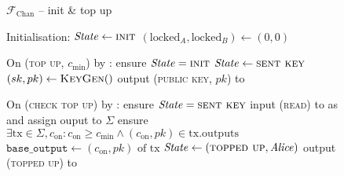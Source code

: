 \begin{figure}[H]
  \begin{systembox}{$\mathcal{F}_{\mathrm{Chan}}$ -- init \& top up}
    \begin{algorithmic}[1]
      \State Initialisation: 
      \Indent
        \State $\mathit{State} \gets \textsc{init}$
        \State $(\mathrm{locked}_A, \mathrm{locked}_B) \gets (0, 0)$
      \EndIndent
      \Statex

      \State On (\textsc{top up}, $c_{\mathrm{min}}$) by \alice:
      \label{code:functionality:chan:skeleton:init:top_up:start}
      \Indent
        \State ensure $\mathit{State} = \textsc{init}$
        \State $\mathit{State} \gets \textsc{sent key}$
        \State $(sk, pk) \gets \textsc{KeyGen}()$
        \State output (\textsc{public key}, $pk$) to \alice
        \label{code:functionality:chan:skeleton:init:top_up:end}
      \EndIndent
      \Statex

      \State On (\textsc{check top up}) by \alice:
      \label{code:functionality:chan:skeleton:init:check_top_up:start}
      \Indent
        \State ensure $\mathit{State} = \textsc{sent key}$
        \State input (\textsc{read}) to \ledger as \alice and assign ouput to
        $\Sigma$
        \State ensure $\exists \mathrm{tx} \in \Sigma, c_{\mathrm{on}}:
        c_{\mathrm{on}} \geq c_{\mathrm{min}} \wedge (c_{\mathrm{on}}, pk) \in
        \mathrm{tx.outputs}$
        \State $\mathtt{base\_output} \gets (c_{\mathrm{on}}, pk) \text{ of tx}$
        \State $\mathit{State} \gets (\textsc{topped up}, \mathit{Alice})$
        \State output (\textsc{topped up}) to \alice
        \label{code:functionality:chan:skeleton:init:check_top_up:end}
      \EndIndent
    \end{algorithmic}
  \end{systembox}
  \caption{}
  \label{code:functionality:chan:skeleton:init}
\end{figure}

